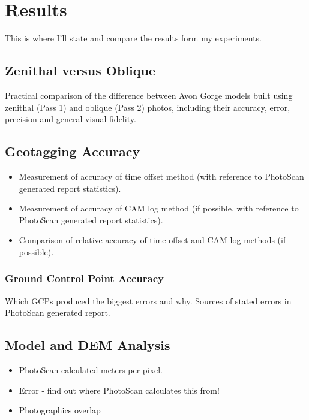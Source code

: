 \section{Results}

This is where I'll state and compare the results form my experiments.

\subsection{Zenithal versus Oblique}
\label{sec:results/zenithal-versus-oblique}

Practical comparison of the difference between Avon Gorge models built using
zenithal (Pass 1) and oblique (Pass 2) photos, including their accuracy, error,
precision and general visual fidelity.

\subsection{Geotagging Accuracy}

\begin{itemize}

    \item Measurement of accuracy of time offset method (with reference to
        PhotoScan generated report statistics).

    \item Measurement of accuracy of CAM log method (if possible, with reference
        to PhotoScan generated report statistics).

    \item Comparison of relative accuracy of time offset and CAM log methods (if
        possible).

\end{itemize}

\subsubsection{Ground Control Point Accuracy}

Which GCPs produced the biggest errors and why. Sources of stated errors in
PhotoScan generated report.

\subsection{Model and DEM Analysis}

\begin{itemize}

    \item PhotoScan calculated meters per pixel.

    \item Error - find out where PhotoScan calculates this from!

    \item Photographics overlap

\end{itemize}
